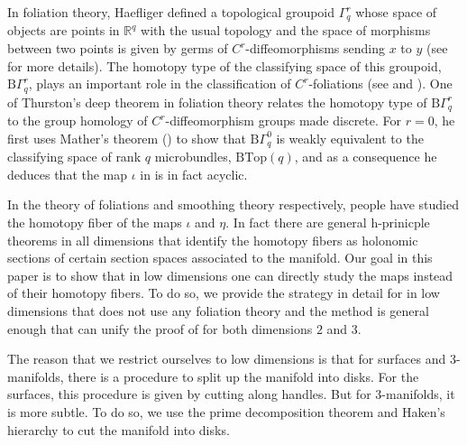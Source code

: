 \documentclass[a4paper]{amsart}
\theoremstyle{definition}
\theoremstyle{remark}
\newcommand{\bR}{\mathbb{R}}
\numberwithin{equation}{section}
\begin{document}
In foliation theory, Haefliger defined a topological groupoid $\Gamma_q^r$ whose space of objects are points in $\bR^q$ with the usual topology and the space of morphisms between two points is given by germs of $C^r$-diffeomorphisms sending $x$ to $y$ (see \cite[Section 1]{haefliger1971homotopy} for more details). The homotopy type of the classifying space of this groupoid, $\mathrm{B}\Gamma_q^r$, plays an important role in the classification of $C^r$-foliations (see \cite{MR0370619} and \cite{MR0425985}). One of Thurston's deep theorem in  foliation theory relates the homotopy type of $\mathrm{B}\Gamma_q^r$ to the group homology of $C^r$-diffeomorphism groups made discrete. For $r=0$, he first uses Mather's theorem (\cite{MR0288777}) to show that $\mathrm{B}\Gamma_q^0$ is weakly equivalent to the classifying space of rank $q$ microbundles, $\mathrm{B} \text{Top}(q)$, and as a consequence he deduces that the map $\iota$ in  is in fact acyclic. 

In the theory of foliations and smoothing theory respectively, people have studied the homotopy fiber of the maps $\iota$ and $\eta$. In fact there are general h-prinicple theorems in all dimensions that identify the homotopy fibers as holonomic sections of certain section spaces associated to the manifold. Our goal in this paper is to show that in low dimensions one can directly study the maps instead of their homotopy fibers. To do so, we provide the strategy in detail for  in low dimensions that does not use any foliation theory and the method is general enough that can unify the proof of  for both dimensions $2$ and $3$. 

The reason that we restrict ourselves to low dimensions is that for surfaces and $3$-manifolds, there is a procedure to split up  the manifold into disks. For the surfaces, this procedure is given by cutting along handles. But for $3$-manifolds, it is more subtle. To do so, we use the prime decomposition theorem and Haken's hierarchy to cut the manifold into disks. 
\end{document}
